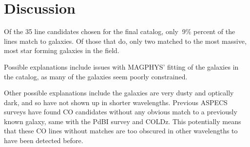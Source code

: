 
\section{Discussion}

Of the 35 line candidates chosen for the final catalog, only $~$9\% percent of the lines match to galaxies. Of those that do, only two matched to the most massive, most star forming galaxies in the field.


Possible explanations include issues with MAGPHYS' fitting of the galaxies in the catalog, as many of the galaxies seem poorly constrained.


Other possible explanations include the galaxies are very dusty and optically dark, and so have not shown up in shorter wavelengths. Previous ASPECS surveys have found CO candidates without any obvious match to a previously known galaxy, same with the PdBI survey and COLDz. This potentially means that these CO lines without matches are too obscured in other wavelengths to have been detected before. 
